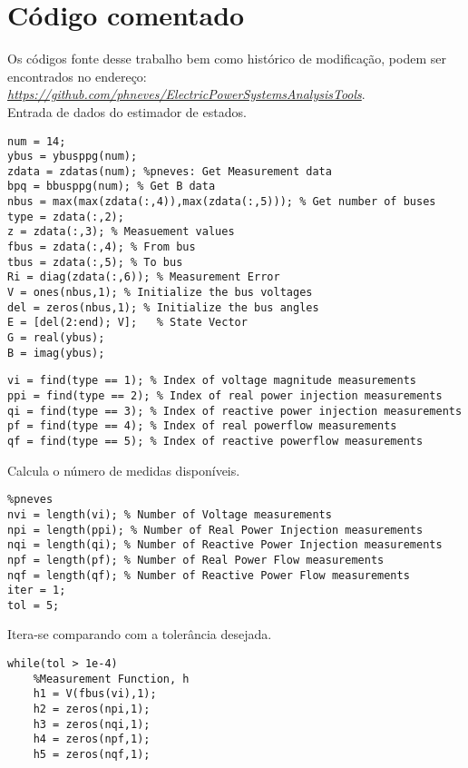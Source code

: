 \chapter{C\'odigo comentado}
\label{SectionCodigo}

Os códigos fonte desse trabalho bem como histórico de modificação, podem ser encontrados no endereço: \textit{\href{https://github.com/phneves/ElectricPowerSystemsAnalysisTools}{https://github.com/phneves/ElectricPowerSystemsAnalysisTools}}.\\
Entrada de dados do estimador de estados.
\begin{verbatim}
num = 14; 
ybus = ybusppg(num); 
zdata = zdatas(num); %pneves: Get Measurement data
bpq = bbusppg(num); % Get B data
nbus = max(max(zdata(:,4)),max(zdata(:,5))); % Get number of buses
type = zdata(:,2);
z = zdata(:,3); % Measuement values
fbus = zdata(:,4); % From bus
tbus = zdata(:,5); % To bus
Ri = diag(zdata(:,6)); % Measurement Error
V = ones(nbus,1); % Initialize the bus voltages
del = zeros(nbus,1); % Initialize the bus angles
E = [del(2:end); V];   % State Vector
G = real(ybus);
B = imag(ybus);
\end{verbatim}

\begin{verbatim}
vi = find(type == 1); % Index of voltage magnitude measurements
ppi = find(type == 2); % Index of real power injection measurements
qi = find(type == 3); % Index of reactive power injection measurements
pf = find(type == 4); % Index of real powerflow measurements
qf = find(type == 5); % Index of reactive powerflow measurements
\end{verbatim}
Calcula o número de medidas disponíveis.
\begin{verbatim}
%pneves
nvi = length(vi); % Number of Voltage measurements
npi = length(ppi); % Number of Real Power Injection measurements
nqi = length(qi); % Number of Reactive Power Injection measurements
npf = length(pf); % Number of Real Power Flow measurements
nqf = length(qf); % Number of Reactive Power Flow measurements
iter = 1;
tol = 5;
\end{verbatim}
Itera-se comparando com a tolerância desejada. 
\begin{verbatim}
while(tol > 1e-4)
    %Measurement Function, h 
    h1 = V(fbus(vi),1);
    h2 = zeros(npi,1);
    h3 = zeros(nqi,1);
    h4 = zeros(npf,1);
    h5 = zeros(nqf,1);
\end{verbatim}

